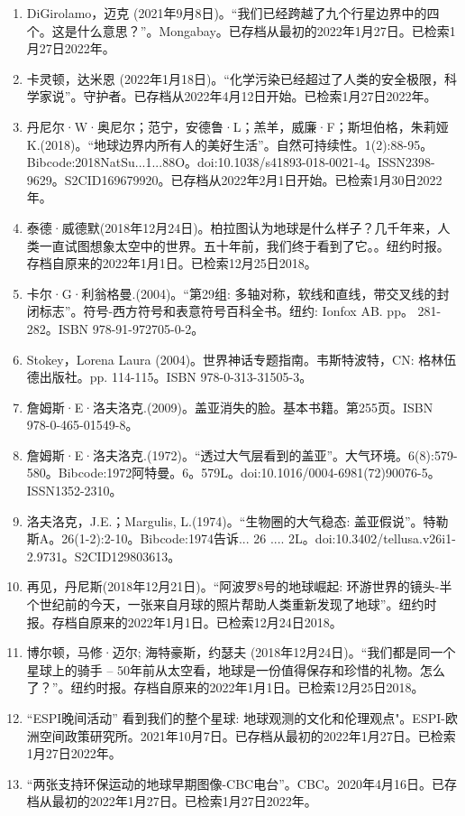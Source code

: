 \begin{enumerate}
\item DiGirolamo，迈克 (2021年9月8日)。“我们已经跨越了九个行星边界中的四个。这是什么意思？”。Mongabay。已存档从最初的2022年1月27日。已检索1月27日2022年。
\item 卡灵顿，达米恩 (2022年1月18日)。“化学污染已经超过了人类的安全极限，科学家说”。守护者。已存档从2022年4月12日开始。已检索1月27日2022年。
\item 丹尼尔·W·奥尼尔；范宁，安德鲁·L；羔羊，威廉·F；斯坦伯格，朱莉娅K.(2018)。“地球边界内所有人的美好生活”。自然可持续性。1(2):88-95。Bibcode:2018NatSu...1...88O。doi:10.1038/s41893-018-0021-4。ISSN2398-9629。S2CID169679920。已存档从2022年2月1日开始。已检索1月30日2022年。  
\item 泰德·威德默(2018年12月24日)。柏拉图认为地球是什么样子？几千年来，人类一直试图想象太空中的世界。五十年前，我们终于看到了它。。纽约时报。存档自原来的2022年1月1日。已检索12月25日2018。
\item 卡尔·G·利翁格曼.(2004)。“第29组: 多轴对称，软线和直线，带交叉线的封闭标志”。符号-西方符号和表意符号百科全书。纽约: Ionfox AB. pp。 281-282。ISBN 978-91-972705-0-2。
\item Stokey，Lorena Laura (2004)。世界神话专题指南。韦斯特波特，CN: 格林伍德出版社。pp. 114-115。ISBN 978-0-313-31505-3。
\item 詹姆斯·E·洛夫洛克.(2009)。盖亚消失的脸。基本书籍。第255页。ISBN 978-0-465-01549-8。
\item 詹姆斯·E·洛夫洛克.(1972)。“透过大气层看到的盖亚”。大气环境。6(8):579-580。Bibcode:1972阿特曼。6。579L。doi:10.1016/0004-6981(72)90076-5。ISSN1352-2310。 
\item 洛夫洛克，J.E.；Margulis, L.(1974)。“生物圈的大气稳态: 盖亚假说”。特勒斯A。26(1-2):2-10。Bibcode:1974告诉... 26 .... 2L。doi:10.3402/tellusa.v26i1-2.9731。S2CID129803613。 
\item 再见，丹尼斯(2018年12月21日)。“阿波罗8号的地球崛起: 环游世界的镜头-半个世纪前的今天，一张来自月球的照片帮助人类重新发现了地球”。纽约时报。存档自原来的2022年1月1日。已检索12月24日2018。
\item 博尔顿，马修·迈尔; 海特豪斯，约瑟夫 (2018年12月24日)。“我们都是同一个星球上的骑手 -- 50年前从太空看，地球是一份值得保存和珍惜的礼物。怎么了？”。纽约时报。存档自原来的2022年1月1日。已检索12月25日2018。
\item “ESPI晚间活动” 看到我们的整个星球: 地球观测的文化和伦理观点"。ESPI-欧洲空间政策研究所。2021年10月7日。已存档从最初的2022年1月27日。已检索1月27日2022年。
\item “两张支持环保运动的地球早期图像-CBC电台”。CBC。2020年4月16日。已存档从最初的2022年1月27日。已检索1月27日2022年。

\end{enumerate}
